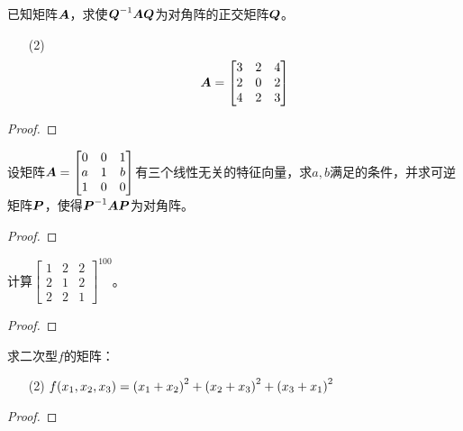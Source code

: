 \begin{problem}
已知矩阵\(\boldsymbol{A}\)，求使\({\boldsymbol{Q}}^{-1}\boldsymbol{A}\boldsymbol{Q}\)为对角阵的正交矩阵\(\boldsymbol{Q}\)。
\begin{enumerate}
    \item[(2)]
        {
        \begin{equation*}
            \boldsymbol{A}=
            \begin{bmatrix}
                3 & 2 & 4 \\
                2 & 0 & 2 \\
                4 & 2 & 3
            \end{bmatrix}
        \end{equation*}
        }
\end{enumerate}
\end{problem}
\begin{proof}

\end{proof}

\setcounter{problem}{29}
\begin{problem}
设矩阵\(\boldsymbol{A}=\begin{bmatrix}0&0&1\\a&1&b\\1&0&0\end{bmatrix}\)有三个线性无关的特征向量，求\(a,b\)满足的条件，并求可逆矩阵\(\boldsymbol{P}\)，使得\({\boldsymbol{P}}^{-1}\boldsymbol{A}\boldsymbol{P}\)为对角阵。
\end{problem}
\begin{proof}

\end{proof}

\setcounter{problem}{31}
\begin{problem}
计算\({\begin{bmatrix}1&2&2\\2&1&2\\2&2&1\end{bmatrix}}^{100}\)。
\end{problem}
\begin{proof}

\end{proof}

\setcounter{problem}{33}
\begin{problem}
求二次型\(f\)的矩阵：
\begin{enumerate}
    \item[(2)] \(f(x_1,x_2,x_3)=\left( x_1+x_2 \right)^2+\left( x_2+x_3 \right)^2+\left( x_3+x_1 \right)^2\)
\end{enumerate}
\end{problem}
\begin{proof}

\end{proof}

